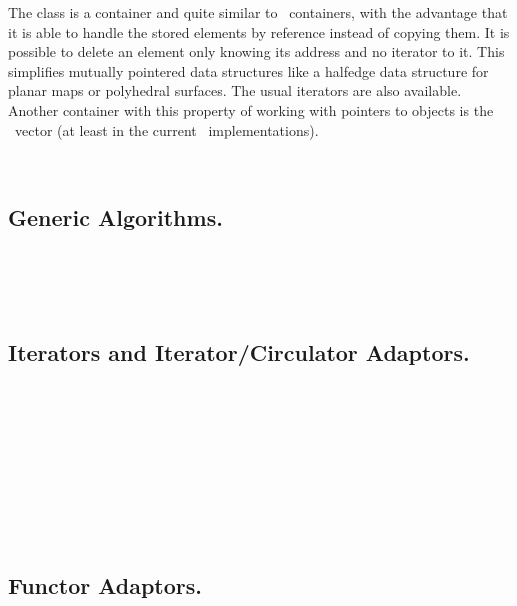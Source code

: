 The class  is a container and quite similar
to \stl\ containers, with the advantage that it is able to handle the
stored elements by reference instead of copying them. It is possible
to delete an element only knowing its address and no iterator to it.
This simplifies mutually pointered data structures like a halfedge
data structure for planar maps or polyhedral surfaces. The usual
iterators are also available.  Another container with this property of
working with pointers to objects is the \stl\ vector (at least in the
current \stl\ implementations).

\\

\subsection*{Generic Algorithms.}

\\
\\
\\

\subsection*{Iterators and Iterator/Circulator Adaptors.}

\\
\\
\\
\\
\\
\\
\\
\\

\subsection*{Functor Adaptors.}


